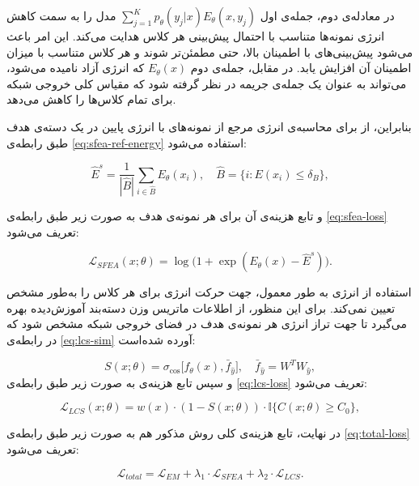 در معادله‌ی دوم، جمله‌ی اول $\sum_{j=1}^{K} p_{\theta}(y_j|x) E_{\theta}(x, y_j)$ مدل را به سمت کاهش انرژی نمونه‌ها متناسب با احتمال پیش‌بینی هر کلاس هدایت می‌کند. 
این امر باعث می‌شود پیش‌بینی‌های با اطمینان بالا، حتی مطمئن‌تر شوند و  هر کلاس متناسب با میزان اطمینان آن افزایش یابد. 
در مقابل، جمله‌ی دوم $E_{\theta}(x)$ که انرژی آزاد نامیده می‌شود، می‌تواند به عنوان یک جمله‌ی جریمه در نظر گرفته شود که مقیاس کلی خروجی شبکه برای تمام کلاس‌ها را کاهش می‌دهد.

بنابراین، از  برای محاسبه‌ی انرژی مرجع از نمونه‌های با انرژی پایین در یک دسته‌ی هدف طبق رابطه‌ی \ref{eq:sfea-ref-energy} استفاده می‌شود\cite{aea}:

\begin{equation}
	\hat{E}^s = \frac{1}{|\hat{B}|} \sum_{i \in \hat{B}} E_\theta(x_i), 
	\quad 
	\hat{B} = \{i : E(x_i) \le \delta_B\},
	\label{eq:sfea-ref-energy}
\end{equation}

و تابع هزینه‌ی آن برای هر نمونه‌ی هدف به صورت زیر طبق رابطه‌ی \ref{eq:sfea-loss} تعریف می‌شود\cite{aea}:

\begin{equation}
	\mathcal{L}_{SFEA}(x; \theta) = \log \big(1 + \exp(E_\theta(x) - \hat{E}^s)\big).
	\label{eq:sfea-loss}
\end{equation}

استفاده از انرژی به طور معمول، جهت حرکت انرژی برای هر کلاس را به‌طور مشخص تعیین نمی‌کند. 
برای این منظور،  از اطلاعات ماتریس وزن دسته‌بند آموزش‌دیده بهره می‌گیرد تا جهت تراز انرژی هر نمونه‌ی هدف در فضای خروجی شبکه مشخص شود که در رابطه‌ی \ref{eq:lcs-sim} آورده شده‌است\cite{aea}:

\begin{equation}
	S(x; \theta) = \sigma_{\cos} \big[f_\theta(x), \bar{f}_{\hat{y}}\big], 
	\quad 
	\bar{f}_{\hat{y}} = W^T W_{ŷ},
	\label{eq:lcs-sim}
\end{equation}
و سپس تابع هزینه‌ی  به صورت زیر طبق رابطه‌ی \ref{eq:lcs-loss} تعریف می‌شود\cite{aea}:

\begin{equation}
	\mathcal{L}_{LCS}(x; \theta) = w(x) \cdot (1 - S(x; \theta)) \cdot \mathbb{I}\{C(x; \theta) \ge C_0\},
	\label{eq:lcs-loss}
\end{equation}

در نهایت، تابع هزینه‌ی کلی روش مذکور هم به صورت زیر طبق رابطه‌ی \ref{eq:total-loss} تعریف می‌شود\cite{aea}:

\begin{equation}
	\mathcal{L}_{total} = \mathcal{L}_{EM} + \lambda_1 \cdot \mathcal{L}_{SFEA} + \lambda_2 \cdot \mathcal{L}_{LCS}.
	\label{eq:total-loss}
\end{equation}


